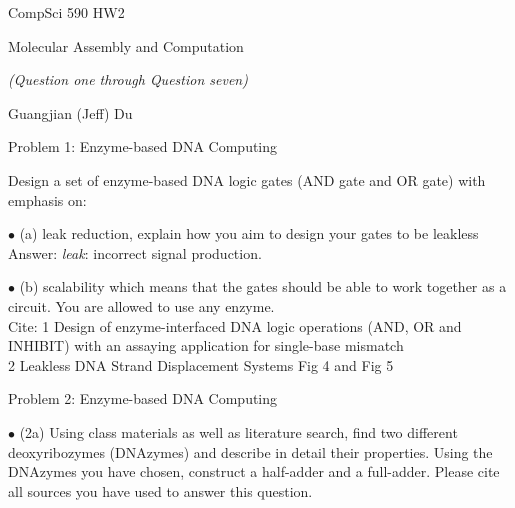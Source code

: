 \documentclass{article}
\begin{document}
\centerline{\sc \large CompSci 590 HW2}
\vspace{1pc}
\centerline{\sc Molecular Assembly and Computation }
\vspace{1pc}

\centerline{\it (Question one through Question seven)}

\vspace{1pc}
\centerline{\sc  Guangjian (Jeff) Du}
\vspace{2pc}


\centerline{\sc Problem 1: Enzyme-based DNA Computing}
\vspace{0.2in}

Design a set of enzyme-based DNA logic gates (AND gate and OR gate) with emphasis on: 

$\bullet$ (a) leak reduction, explain how you aim to design your gates to be leakless \\
Answer: \textit{leak}: incorrect signal production.

\vspace{0.1in}
$\bullet$ (b) scalability which means that the gates should be able to work together as a circuit. 
You are allowed to use any enzyme.\\


Cite: 1 Design of enzyme-interfaced DNA logic operations (AND, OR and INHIBIT) with an assaying application for single-base mismatch \\
	  2 Leakless DNA Strand Displacement Systems Fig 4 and Fig 5









\newpage
\centerline{\sc Problem 2: Enzyme-based DNA Computing}
\vspace{0.2in}
$\bullet$ (2a) Using class materials as well as literature search, find two different deoxyribozymes (DNAzymes) and describe in detail their properties. Using the DNAzymes you have chosen, construct a half-adder and a full-adder. Please cite all sources you have used to answer this question.\\
\end{document}
